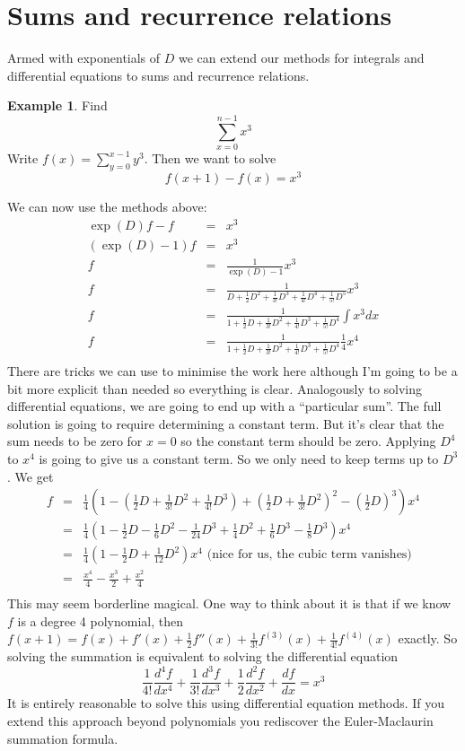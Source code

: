 \documentclass[a4paper]{article}
\theoremstyle{definition}
\newtheorem{example}{Example}[section]
\begin{document}
\section{Sums and recurrence relations}
Armed with exponentials of $D$ we can extend our methods for integrals and differential equations to sums and recurrence relations.
\begin{example}
Find
\[
\sum_{x=0}^{n-1}x^3
\]
Write $f(x) = \sum_{y=0}^{x-1}y^3$.
Then we want to solve
\[
f(x+1)-f(x) = x^3
\]
\end{example}
We can now use the methods above:
\begin{eqnarray*}
\exp(D)f-f & = & x^3 \\
(\exp(D)-1)f & = & x^3 \\
f & = & \frac{1}{\exp(D)-1}x^3 \\
f & = & \frac{1}{D+\frac{1}{2}D^2+\frac{1}{3!}D^3+\frac{1}{4!}D^4+\frac{1}{5!}D^5}x^3 \\
f & = & \frac{1}{1+\frac{1}{2}D+\frac{1}{3!}D^2+\frac{1}{4!}D^3+\frac{1}{5!}D^4}\int x^3dx \\
f & = & \frac{1}{1+\frac{1}{2}D+\frac{1}{3!}D^2+\frac{1}{4!}D^3+\frac{1}{5!}D^4}\frac{1}{4}x^4 \\
\end{eqnarray*}
There are tricks we can use to minimise the work here although I'm going to be a bit more explicit than needed so everything is clear.
Analogously to solving differential equations, we are going to end up with a ``particular sum''.
The full solution is going to require determining a constant term.
But it's clear that the sum needs to be zero for $x=0$ so the constant term should be zero.
Applying $D^4$ to $x^4$ is going to give us a constant term.
So we only need to keep terms up to $D^3$.
We get
\begin{eqnarray*}
f & = & \frac{1}{4}(1-(\frac{1}{2}D+\frac{1}{3!}D^2+\frac{1}{4!}D^3)+
        (\frac{1}{2}D+\frac{1}{3!}D^2)^2-(\frac{1}{2}D)^3)x^4 \\
  & = & \frac{1}{4}(1-\frac{1}{2}D-\frac{1}{6}D^2-\frac{1}{24}D^3+
        \frac{1}{4}D^2+\frac{1}{6}D^3-\frac{1}{8}D^3)x^4 \\
  & = & \frac{1}{4}(1-\frac{1}{2}D+\frac{1}{12}D^2)x^4 \mbox{ (nice for us, the cubic term vanishes)} \\
  & = & \frac{x^4}{4}-\frac{x^3}{2}+\frac{x^2}{4} \\
\end{eqnarray*}
This may seem borderline magical.
One way to think about it is that if we know $f$ is a degree 4 polynomial, then $f(x+1) = f(x)+f'(x)+\frac{1}{2}f''(x)+\frac{1}{3!}f^{(3)}(x)+\frac{1}{4!}f^{(4)}(x)$ exactly.
So solving the summation is equivalent to solving the differential equation
\[
\frac{1}{4!}\frac{d^4f}{dx^4}+\frac{1}{3!}\frac{d^3f}{dx^3}+\frac{1}{2}\frac{d^2f}{dx^2}+\frac{df}{dx} = x^3
\]
It is entirely reasonable to solve this using differential equation methods.
If you extend this approach beyond polynomials you rediscover the Euler-Maclaurin summation formula.
\end{document}
